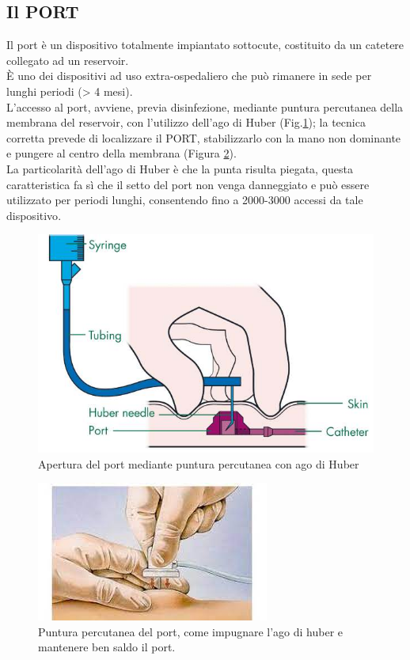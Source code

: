 \subsection{Il PORT}

Il port è un dispositivo totalmente impiantato sottocute, costituito da un catetere collegato ad un reservoir\cite{AIOMCVC}.\\
È uno dei dispositivi ad uso extra-ospedaliero che può rimanere in sede per lunghi periodi (> 4 mesi)\cite{GAVECELTracc2021}.\\
L’accesso al port, avviene, previa disinfezione, mediante puntura percutanea della membrana del reservoir, con 
l’utilizzo dell’ago di Huber (Fig.\ref{fig:FIGURE_4.6})\cite{AIOMCVC}; la tecnica corretta prevede di localizzare il PORT,
stabilizzarlo con la mano non dominante e pungere al centro della membrana (Figura \ref{fig:FIGURE_4.7}).\\
La particolarità dell’ago di Huber è che la punta risulta piegata, questa caratteristica fa sì che il 
setto del port non venga danneggiato e può essere utilizzato per periodi lunghi,
consentendo fino a 2000-3000 accessi da tale dispositivo\cite{AIOMCVC}.\\

\begin{figure}[H]
    \begin{center}
    \includegraphics[width=0.5\columnwidth]{img/port-a-cath-picc.jpeg}
    \end{center}
    \caption{Apertura del port mediante puntura percutanea con ago di Huber
    \cite{img43}}
    \label{fig:FIGURE_4.6}
\end{figure}

\begin{figure}[H]
    \begin{center}
    \includegraphics[width=0.5\columnwidth]{img/port2.jpeg}
    \end{center}
    \caption{Puntura percutanea del port, come impugnare l’ago di huber e mantenere ben saldo il port.
    \cite{img44}}
    \label{fig:FIGURE_4.7}
\end{figure}

